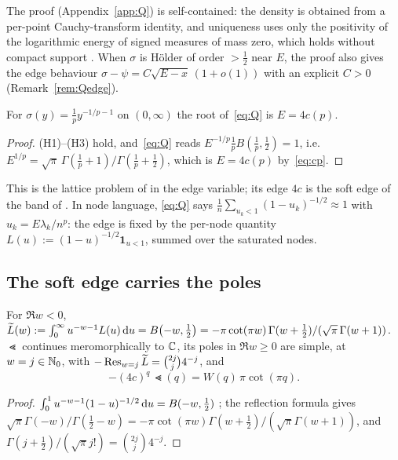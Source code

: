 The proof (Appendix~\ref{app:Q}) is self-contained: the density is obtained from a per-point Cauchy-transform identity, and uniqueness
uses only the positivity of the logarithmic energy of signed measures of mass zero, which holds without compact support
\cite[Lemma~3.3]{PaperI}. When $\sigma$ is H\"older of order $>\frac12$ near $E$, the proof also gives the edge behaviour
$\sigma-\psi=C\sqrt{E-x}\,(1+o(1))$ with an explicit $C>0$ (Remark~\ref{rem:Qedge}).

\begin{corollary}\label{cor:Q1}
For $\sigma(y)=\frac1py^{-1/p-1}$ on $(0,\infty)$ the root of~\eqref{eq:Q} is $E=4c(p)$.
\end{corollary}

\begin{proof}
(H1)--(H3) hold, and~\eqref{eq:Q} reads $E^{-1/p}\frac1pB(\frac1p,\frac12)=1$, i.e.\ $E^{1/p}=\sqrt\pi\,\Gamma(\frac1p+1)/\Gamma(\frac1p+\frac12)$,
which is $E=4c(p)$ by~\eqref{eq:cp}.
\end{proof}

This is the lattice problem of \cite[Theorem~1.3]{PaperI} in the edge variable; its edge $4c$ is the soft edge of the band of
\cite{PaperII}. In node language, \eqref{eq:Q} says $\frac1n\sum_{u_k<1}(1-u_k)^{-1/2}\approx1$ with $u_k=E\lambda_k/n^p$: the edge is fixed
by the per-node quantity $L(u):=(1-u)^{-1/2}\mathbf 1_{u<1}$, summed over the saturated nodes.

\subsection{The soft edge carries the poles}\label{sec:M12}

\begin{lemma}\label{lem:K0}
For $\Re w<0$,
$\widetilde L(w):=\int_0^\infty u^{-w-1}L(u)\,\mathrm{d} u=B\bigl(-w,\tfrac12\bigr)=-\pi\cot(\pi w)\,\Gamma(w+\frac12)/(\sqrt\pi\,\Gamma(w+1))$. $\Lt$
continues meromorphically to $\mathbb{C}$, its poles in $\Re w\ge0$ are simple, at $w=j\in\mathbb{N}_0$, with $-\operatorname{Res}_{w=j}\widetilde L=\binom{2j}j4^{-j}$, and
\begin{equation}\label{eq:Lt-W}
  -(4c)^q\,\Lt(q)=W(q)\,\pi\cot(\pi q).
\end{equation}
\end{lemma}

\begin{proof}
$\int_0^1u^{-w-1}(1-u)^{-1/2}\,\mathrm{d} u=B(-w,\frac12)$ \cite[(5.12.1)]{DLMF}; the reflection formula \cite[(5.5.3)]{DLMF} gives
$\sqrt\pi\Gamma(-w)/\Gamma(\frac12-w)=-\pi\cot(\pi w)\Gamma(w+\frac12)/(\sqrt\pi\Gamma(w+1))$, and $\Gamma(j+\frac12)/(\sqrt\pi j!)=\binom{2j}j4^{-j}$.
\end{proof}

